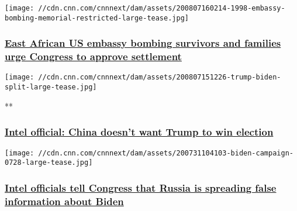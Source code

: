 \href{/2020/08/07/politics/us-embassy-bombings-sudan-settlement/index.html}{}

\texttt{[image: //cdn.cnn.com/cnnnext/dam/assets/200807160214-1998-embassy-bombing-memorial-restricted-large-tease.jpg]}

\hypertarget{east-african-us-embassy-bombing-survivors-and-families-urge-congress-to-approve-settlement}{%
\subsubsection{\texorpdfstring{\href{/2020/08/07/politics/us-embassy-bombings-sudan-settlement/index.html}{East
African US embassy bombing survivors and families urge Congress to
approve
settlement}}{East African US embassy bombing survivors and families urge Congress to approve settlement}}\label{east-african-us-embassy-bombing-survivors-and-families-urge-congress-to-approve-settlement}}

\href{/videos/politics/2020/08/07/2020-election-russia-china-iran-perez-sot-nr-vpx.cnn}{}

\texttt{[image: //cdn.cnn.com/cnnnext/dam/assets/200807151226-trump-biden-split-large-tease.jpg]}

**

\hypertarget{intel-official-china-doesnt-want-trump-to-win-election}{%
\subsubsection{\texorpdfstring{\href{/videos/politics/2020/08/07/2020-election-russia-china-iran-perez-sot-nr-vpx.cnn}{Intel
official: China doesn't want Trump to win
election}}{Intel official: China doesn't want Trump to win election}}\label{intel-official-china-doesnt-want-trump-to-win-election}}

\href{/2020/08/07/politics/us-intelligence-russia-election-interference-biden/index.html}{}

\texttt{[image: //cdn.cnn.com/cnnnext/dam/assets/200731104103-biden-campaign-0728-large-tease.jpg]}

\hypertarget{intel-officials-tell-congress-that-russia-is-spreading-false-information-about-biden}{%
\subsubsection{\texorpdfstring{\href{/2020/08/07/politics/us-intelligence-russia-election-interference-biden/index.html}{Intel
officials tell Congress that Russia is spreading false information about
Biden}}{Intel officials tell Congress that Russia is spreading false information about Biden}}\label{intel-officials-tell-congress-that-russia-is-spreading-false-information-about-biden}}

